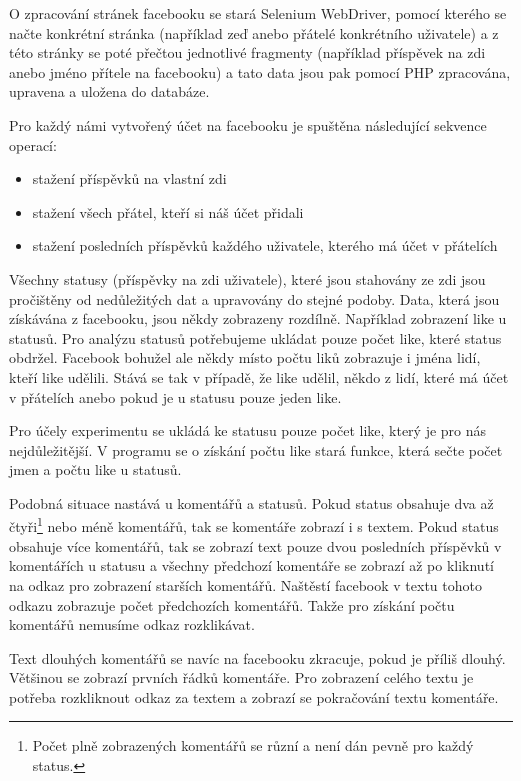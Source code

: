 \documentclass[thesis=M,czech]{FITthesis}[2013/05/10]
\begin{document}
O zpracování stránek facebooku se stará Selenium WebDriver, pomocí 
kterého se načte konkrétní stránka (například zeď anebo přátelé 
konkrétního uživatele) a z této stránky se poté přečtou jednotlivé 
fragmenty (například příspěvek na zdi anebo jméno přítele na 
facebooku) a tato data jsou pak pomocí PHP zpracována, upravena a 
uložena do databáze. 

Pro každý námi vytvořený účet na facebooku je spuštěna následující sekvence operací:

\begin{itemize}
  \item stažení příspěvků na vlastní zdi
  \item stažení všech přátel, kteří si náš účet přidali
  \item stažení posledních příspěvků každého uživatele, kterého má účet v přátelích
\end{itemize}

Všechny statusy (příspěvky na zdi uživatele), které jsou stahovány ze zdi jsou pročištěny od nedůležitých dat a upravovány do stejné podoby. Data, která jsou získávána z facebooku, jsou někdy zobrazeny rozdílně. Například zobrazení like u statusů. Pro analýzu statusů potřebujeme ukládat pouze počet like, které status obdržel. Facebook bohužel ale někdy místo počtu liků zobrazuje i jména lidí, kteří like udělili. Stává se tak v případě, že like udělil, někdo z lidí, které má účet v přátelích anebo pokud je u statusu pouze jeden like.

Pro účely experimentu se ukládá ke statusu pouze počet like, který je pro nás nejdůležitější. V programu se o získání počtu like stará funkce, která sečte počet jmen a počtu like u statusů. 

Podobná situace nastává u komentářů a statusů. Pokud status obsahuje dva až čtyři\footnote{Počet plně zobrazených komentářů se různí a není dán pevně pro každý status.} nebo méně komentářů, tak se komentáře zobrazí i s textem. Pokud status obsahuje  více komentářů, tak se zobrazí text pouze dvou posledních příspěvků v komentářích u statusu a všechny předchozí komentáře se zobrazí až po kliknutí na odkaz pro zobrazení starších komentářů. Naštěstí facebook v textu tohoto odkazu zobrazuje počet předchozích komentářů. Takže pro získání počtu komentářů nemusíme odkaz rozklikávat. 

Text dlouhých komentářů se navíc na facebooku zkracuje, pokud je příliš dlouhý. Většinou se zobrazí prvních řádků komentáře. Pro zobrazení celého textu je potřeba rozkliknout odkaz za textem a zobrazí se pokračování textu komentáře. 
\end{document}
